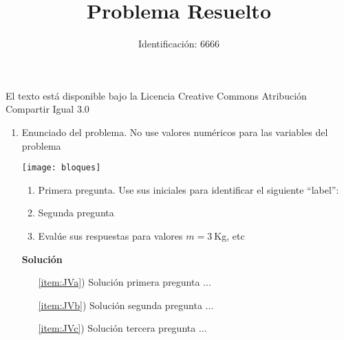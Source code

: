 \documentclass[12pt]{article}
\title{Problema Resuelto}
\author{Identificación: 6666}
\begin{document}
\maketitle


El texto está disponible bajo la Licencia Creative Commons Atribución Compartir Igual 3.0
\begin{enumerate} 

\item Enunciado del problema. No use valores numéricos para las variables del problema

  \begin{minipage}{0.4\linewidth}
    \texttt{[image: bloques]}
  \end{minipage}
  \begin{minipage}{0.6\linewidth}
    \begin{enumerate}
    \item Primera pregunta. Use sus iniciales para identificar el  siguiente ``label'':
      \label{item:JVa}
    \item Segunda pregunta
      \label{item:JVb}
    \item Evalúe sus respuestas para valores $m=3\ $Kg, etc
      \label{item:JVc}
    \end{enumerate}
  \end{minipage}
  
  \textbf{Solución}
  \begin{itemize}
  \item[\ref{item:JVa})] Solución primera pregunta ...
  \item[\ref{item:JVb})] Solución segunda pregunta ...
  \item[\ref{item:JVc})] Solución tercera pregunta ...
  \end{itemize}

\end{enumerate}
\end{document}
